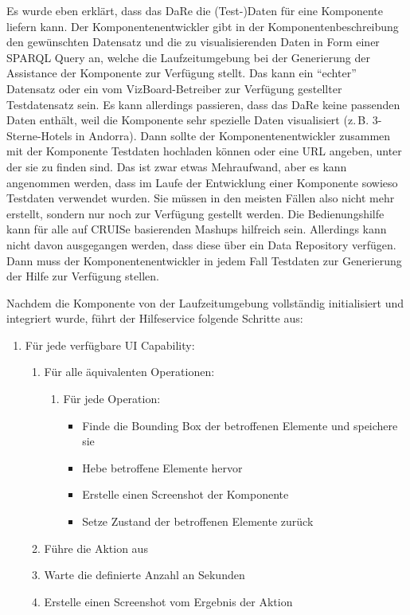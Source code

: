 \documentclass[
	headsepline,
	footsepline,
	fontsize=12pt,
	bibliography=totoc
]{scrbook}
\begin{document}
Es wurde eben erklärt, dass das DaRe die (Test-)Daten für eine Komponente liefern kann. Der Komponentenentwickler gibt in der Komponentenbeschreibung den gewünschten Datensatz und die zu visualisierenden Daten in Form einer SPARQL Query an, welche die Laufzeitumgebung bei der Generierung der Assistance der Komponente zur Verfügung stellt. Das kann ein \enquote{echter} Datensatz oder ein vom VizBoard-Betreiber zur Verfügung gestellter Testdatensatz sein. Es kann allerdings passieren, dass das DaRe keine passenden Daten enthält, weil die Komponente sehr spezielle Daten visualisiert (z.\,B. 3-Sterne-Hotels in Andorra). Dann sollte der Komponentenentwickler zusammen mit der Komponente Testdaten hochladen können oder eine URL angeben, unter der sie zu finden sind. Das ist zwar etwas Mehraufwand, aber es kann angenommen werden, dass im Laufe der Entwicklung einer Komponente sowieso Testdaten verwendet wurden. Sie müssen in den meisten Fällen also nicht mehr erstellt, sondern nur noch zur Verfügung gestellt werden. Die Bedienungshilfe kann für alle auf CRUISe basierenden Mashups hilfreich sein. Allerdings kann nicht davon ausgegangen werden, dass diese über ein Data Repository verfügen. Dann muss der Komponentenentwickler in jedem Fall Testdaten zur Generierung der Hilfe zur Verfügung stellen.

Nachdem die Komponente von der Laufzeitumgebung vollständig initialisiert und integriert wurde, führt der Hilfeservice folgende Schritte aus:

\begin{enumerate}
	\item Für jede verfügbare UI Capability:
	\begin{enumerate}
		\item Für alle äquivalenten Operationen:
		\begin{enumerate}
			\item Für jede Operation:
			\begin{itemize}
				\item Finde die Bounding Box der betroffenen Elemente und speichere sie
				\item Hebe betroffene Elemente hervor
				\item Erstelle einen Screenshot der Komponente
				\item Setze Zustand der betroffenen Elemente zurück
			\end{itemize}
		\end{enumerate}
		\item Führe die Aktion aus
		\item Warte die definierte Anzahl an Sekunden
		\item Erstelle einen Screenshot vom Ergebnis der Aktion
	\end{enumerate}
\end{enumerate}
\end{document}
